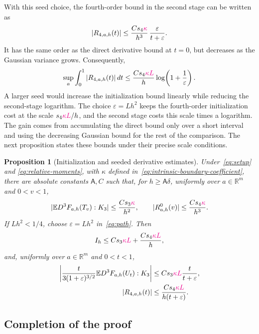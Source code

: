 \documentclass[11pt,letterpaper]{article}
\newcommand{\vSix}[1]{{\color{magenta}#1}}
\newtheorem{proposition}{Proposition}
\theoremstyle{remark}
\newcommand{\E}{\mathbb E}
\newcommand{\R}{\mathbb R}
\begin{document}
{{With this seed choice, the fourth-order bound in the second stage
can be written as
\[
 |R_{4,a,h}(t)|
 \le \frac{Cs_4\vSix{\kappa}}{h^3}\,
       \frac{\varepsilon}{t+\varepsilon}.
\]
It has the same order as the direct derivative bound at \(t=0\),
but decreases as the Gaussian variance grows. Consequently,
\[
 \sup_a\int_0^1|R_{4,a,h}(t)|\,dt
 \le \frac{Cs_4\vSix{\kappa L}}h
       \log\!\left(1+\frac1\varepsilon\right).
\]
A larger seed would increase the initialization bound linearly while
reducing the second-stage logarithm. The choice \(\varepsilon=Lh^2\)
keeps the fourth-order initialization cost at the scale
\(s_4\vSix{\kappa L}/h\), and the second stage costs this scale times a
logarithm. The gain comes from accumulating the direct bound only
over a short interval and using the decreasing Gaussian bound for
the rest of the comparison.
The next proposition states these bounds under their precise
scale conditions.
}

}

\begin{proposition}[Initialization and seeded derivative estimates]
\label{an:prop:derivative}
\vSix{Under~\eqref{eq:setup} and \eqref{eq:relative-moments}, with
\(\kappa\) defined in~\eqref{eq:intrinsic-boundary-coefficient}, there are absolute constants} \(\mathsf A,C\)
such that, for \(h\ge\mathsf A\delta\), uniformly over
\(a\in\R^m\) and \(0<v<1\),
\begin{equation}
 |\E D^3F_{a,h}(T_v):K_3|\le\frac{Cs_3\vSix{\kappa}}{h^2},
 \qquad |R^0_{a,h}(v)|\le\frac{Cs_4\vSix{\kappa}}{h^3}.
 \label{eq:direct-initialization}
\end{equation}
If \(Lh^2<1/4\), choose \(\varepsilon=Lh^2\) in~\eqref{eq:path}.
Then
\begin{equation}
 I_h\le Cs_3 \vSix{\kappa L}+\frac{Cs_4\vSix{\kappa L}}h,
 \label{eq:initialization-bound}
\end{equation}
and, uniformly over \(a\in\R^m\) and \(0<t<1\),
\begin{equation}
 \begin{aligned}
 \left|\frac{t}{3(1+\varepsilon)^{3/2}}
          \E D^3F_{a,h}(U_t):K_3\right|
 &\le Cs_3 \vSix{\kappa L}\frac{t}{t+\varepsilon},\\
 |R_{4,a,h}(t)|&\le\frac{Cs_4\vSix{\kappa L}}{h(t+\varepsilon)}.
 \end{aligned}
 \label{eq:seeded-derivatives}
\end{equation}

\end{proposition}
\subsection{\vSix{Completion of the proof}}\label{sec:proof-theorem-one}
\end{document}

